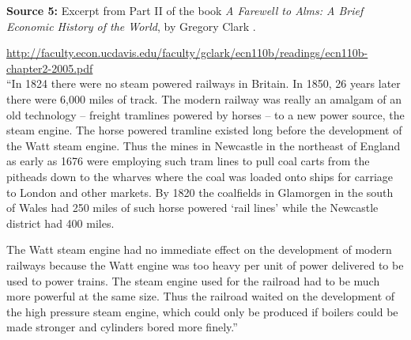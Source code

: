 \textbf{Source 5:} Excerpt from Part II of the book \emph{A Farewell to Alms: A Brief Economic History of the World}, by Gregory Clark \cite{clark07}.

\url{http://faculty.econ.ucdavis.edu/faculty/gclark/ecn110b/readings/ecn110b-chapter2-2005.pdf} \\

``In 1824 there were no steam powered railways in Britain. In 1850, 26 years later there were 6,000 miles of track. The modern railway was really an amalgam of an old technology – freight tramlines powered by horses – to a new power source, the steam engine. The horse powered
tramline existed long before the development of the Watt steam engine. Thus the mines in Newcastle in the northeast of England as early as 1676 were employing such tram lines to pull coal carts from the pitheads down to the wharves where the coal was loaded onto ships for
carriage to London and other markets. By 1820 the coalfields in Glamorgen in the south of Wales had 250 miles of such horse powered `rail lines' while the Newcastle district had 400 miles.
 
The Watt steam engine had no immediate effect on the development of modern railways because the Watt engine was too heavy per unit of power delivered to be used to power trains. The steam engine used for the railroad had to be much more powerful at the same size. Thus the
railroad waited on the development of the high pressure steam engine, which could only be produced if boilers could be made stronger and cylinders bored more finely.'' \\